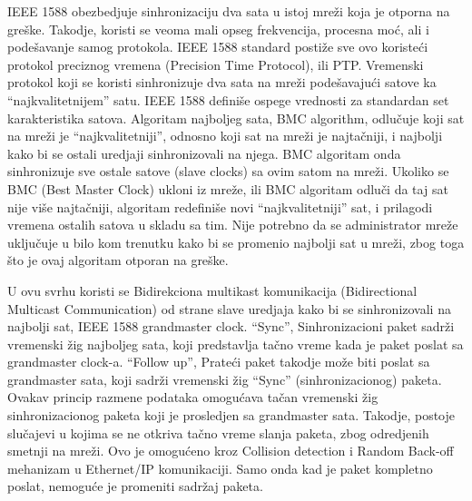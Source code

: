 \documentclass[a4paper,12pt, master]{etf}
\begin{document}
	IEEE 1588 obezbedjuje sinhronizaciju dva sata u istoj mre\v{z}i koja je
	otporna na gre\v{s}ke. Takodje, koristi se veoma mali opseg frekvencija,
	procesna mo\'{c}, ali i pode\v{s}avanje samog protokola. IEEE 1588 standard
	posti\v{z}e sve ovo koriste\'{c}i protokol preciznog vremena (Precision
	Time Protocol), ili PTP\@. Vremenski protokol koji se koristi sinhronizuje
	dva sata na	mre\v{z}i pode\v{s}avaju\'{c}i satove ka ``najkvalitetnijem''
	satu. IEEE 1588	defini\v{s}e ospege vrednosti za standardan set
	karakteristika satova. Algoritam najboljeg sata, BMC algorithm,
	odlu\v{c}uje koji sat na mre\v{z}i je ``najkvalitetniji'', odnosno koji sat
	na mre\v{z}i je najta\v{c}niji, i najbolji kako bi se ostali uredjaji
	sinhronizovali na njega. BMC algoritam onda sinhronizuje sve ostale satove
	(slave clocks) sa ovim satom na mre\v{z}i.	Ukoliko se BMC (Best Master
	Clock) ukloni iz mre\v{z}e, ili BMC algoritam odlu\v{c}i da taj sat
	nije vi\v{s}e najta\v{c}niji, algoritam redefini\v{s}e novi
	``najkvalitetniji'' sat, i prilagodi vremena ostalih satova u skladu sa
	tim. Nije potrebno da se administrator mre\v{z}e uklju\v{c}uje u bilo kom
	trenutku kako bi se promenio najbolji sat u mre\v{z}i, zbog toga \v{s}to je
	ovaj algoritam otporan na gre\v{s}ke.

	U ovu svrhu koristi se Bidirekciona multikast komunikacija (Bidirectional
	Multicast Communication) od strane slave uredjaja kako bi se sinhronizovali
	na najbolji sat, IEEE 1588 grandmaster clock. ``Sync'', Sinhronizacioni
	paket sadr\v{z}i vremenski \v{z}ig najboljeg sata, koji predstavlja
	ta\v{c}no vreme kada je paket poslat sa grandmaster clock-a. ``Follow up'',
	Prate\'{c}i paket takodje mo\v{z}e biti poslat sa grandmaster sata, koji
	sadr\v{z}i vremenski \v{z}ig ``Sync'' (sinhronizacionog) paketa. Ovakav
	princip razmene podataka omogu\'{c}ava ta\v{c}an vremenski \v{z}ig
	sinhronizacionog paketa koji je prosledjen sa grandmaster sata. Takodje,
	postoje	slu\v{c}ajevi u kojima se ne otkriva ta\v{c}no vreme slanja paketa,
	zbog odredjenih smetnji na mre\v{z}i. Ovo je omogu\'{c}eno kroz Collision
	detection i Random Back-off	mehanizam u Ethernet/IP komunikaciji. Samo onda
	kad je paket kompletno poslat, nemogu\'{c}e	je promeniti sadr\v{z}aj paketa.
\end{document}
